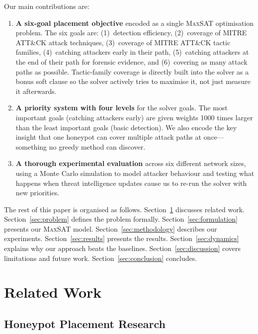 \documentclass[journal]{IEEEtran}
\newcommand{\maxsat}{\textsc{MaxSAT}}
\begin{document}
Our main contributions are:

\begin{enumerate}
\item \textbf{A six-goal placement objective} encoded as a
single \maxsat{} optimisation problem.
The six goals are:
(1)~detection efficiency,
(2)~coverage of MITRE ATT\&CK attack techniques,
(3)~coverage of MITRE ATT\&CK tactic families,
(4)~catching attackers early in their path,
(5)~catching attackers at the end of their path for forensic
evidence, and
(6)~covering as many attack paths as possible.
Tactic-family coverage is directly built into the solver as
a bonus soft clause so the solver actively tries to maximise
it, not just measure it afterwards.

\item \textbf{A priority system with four levels} for the
solver goals.
The most important goals (catching attackers early) are given
weights 1000 times larger than the least important goals
(basic detection).
We also encode the key insight that one honeypot can cover
multiple attack paths at once---something no greedy method
can discover.

\item \textbf{A thorough experimental evaluation} across six
different network sizes, using a Monte Carlo simulation to
model attacker behaviour and testing what happens when threat
intelligence updates cause us to re-run the solver with new
priorities.
\end{enumerate}

The rest of this paper is organised as follows.
Section~\ref{sec:related} discusses related work.
Section~\ref{sec:problem} defines the problem formally.
Section~\ref{sec:formulation} presents our \maxsat{} model.
Section~\ref{sec:methodology} describes our experiments.
Section~\ref{sec:results} presents the results.
Section~\ref{sec:dynamics} explains why our approach beats
the baselines.
Section~\ref{sec:discussion} covers limitations and future
work.
Section~\ref{sec:conclusion} concludes.

\section{Related Work}
\label{sec:related}

\subsection{Honeypot Placement Research}
\end{document}
